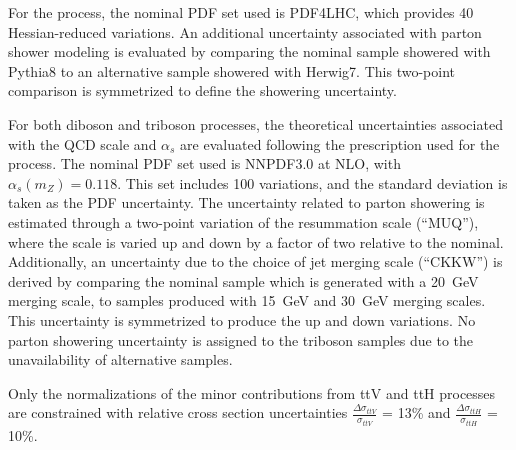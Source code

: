 For the \wh{} process, the nominal PDF set used is PDF4LHC, which provides 40 Hessian-reduced variations. An additional uncertainty associated with parton shower modeling is evaluated by comparing the nominal sample showered with Pythia8 to an alternative sample showered with Herwig7. This two-point comparison is symmetrized to define the showering uncertainty.

For both diboson and triboson processes, the theoretical uncertainties associated with the QCD scale and $\alpha_{s}$ are evaluated following the prescription used for the \wh{} process. The nominal PDF set used is NNPDF3.0 at NLO, with $\alpha_{s} (m_Z) = 0.118$. This set includes 100 variations, and the standard deviation is taken as the PDF uncertainty. The uncertainty related to parton showering is estimated through a two-point variation of the resummation scale (``MUQ''), where the scale is varied up and down by a factor of two relative to the nominal. Additionally, an uncertainty due to the choice of jet merging scale (``CKKW'') is derived by comparing the nominal sample which is generated with a 20~GeV merging scale, to samples produced with 15~GeV and 30~GeV merging scales. This uncertainty is symmetrized to produce the up and down variations. No parton showering uncertainty is assigned to the triboson samples due to the unavailability of alternative samples.

Only the normalizations of the minor contributions from ttV and ttH processes are constrained with relative cross section uncertainties $\frac{\Delta\sigma_{ttV}}{\sigma_{ttV}}$ = 13\% and $\frac{\Delta\sigma_{ttH}}{\sigma_{ttH}}$ = 10\%.


